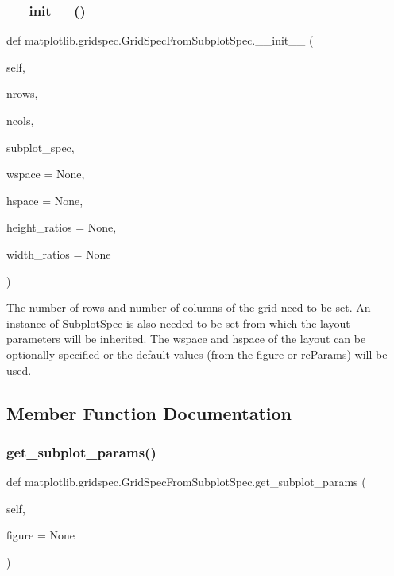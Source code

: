\subsubsection{\texorpdfstring{\+\_\+\+\_\+init\+\_\+\+\_\+()}{\_\_init\_\_()}}
{\footnotesize\ttfamily def matplotlib.\+gridspec.\+Grid\+Spec\+From\+Subplot\+Spec.\+\_\+\+\_\+init\+\_\+\+\_\+ (\begin{DoxyParamCaption}\item[{}]{self,  }\item[{}]{nrows,  }\item[{}]{ncols,  }\item[{}]{subplot\+\_\+spec,  }\item[{}]{wspace = {\ttfamily None},  }\item[{}]{hspace = {\ttfamily None},  }\item[{}]{height\+\_\+ratios = {\ttfamily None},  }\item[{}]{width\+\_\+ratios = {\ttfamily None} }\end{DoxyParamCaption})}

\begin{DoxyVerb}The number of rows and number of columns of the grid need to
be set. An instance of SubplotSpec is also needed to be set
from which the layout parameters will be inherited. The wspace
and hspace of the layout can be optionally specified or the
default values (from the figure or rcParams) will be used.
\end{DoxyVerb}
 

\subsection{Member Function Documentation}
\mbox{\label{classmatplotlib_1_1gridspec_1_1GridSpecFromSubplotSpec_aa1abb3a93ddd58db397865f95143e368}} 
\subsubsection{\texorpdfstring{get\+\_\+subplot\+\_\+params()}{get\_subplot\_params()}}
{\footnotesize\ttfamily def matplotlib.\+gridspec.\+Grid\+Spec\+From\+Subplot\+Spec.\+get\+\_\+subplot\+\_\+params (\begin{DoxyParamCaption}\item[{}]{self,  }\item[{}]{figure = {\ttfamily None} }\end{DoxyParamCaption})}

